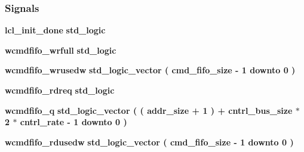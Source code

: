 \subsubsection*{Signals}
 \begin{DoxyCompactItemize}
\item 
{\bf lcl\+\_\+init\+\_\+done} {\bfseries \textcolor{comment}{std\+\_\+logic}\textcolor{vhdlchar}{ }} 
\item 
{\bf wcmdfifo\+\_\+wrfull} {\bfseries \textcolor{comment}{std\+\_\+logic}\textcolor{vhdlchar}{ }} 
\item 
{\bf wcmdfifo\+\_\+wrusedw} {\bfseries \textcolor{comment}{std\+\_\+logic\+\_\+vector}\textcolor{vhdlchar}{ }\textcolor{vhdlchar}{(}\textcolor{vhdlchar}{ }\textcolor{vhdlchar}{ }\textcolor{vhdlchar}{ }\textcolor{vhdlchar}{ }{\bfseries {\bf cmd\+\_\+fifo\+\_\+size}} \textcolor{vhdlchar}{-\/}\textcolor{vhdlchar}{ } \textcolor{vhdldigit}{1} \textcolor{vhdlchar}{ }\textcolor{keywordflow}{downto}\textcolor{vhdlchar}{ }\textcolor{vhdlchar}{ } \textcolor{vhdldigit}{0} \textcolor{vhdlchar}{ }\textcolor{vhdlchar}{)}\textcolor{vhdlchar}{ }} 
\item 
{\bf wcmdfifo\+\_\+rdreq} {\bfseries \textcolor{comment}{std\+\_\+logic}\textcolor{vhdlchar}{ }} 
\item 
{\bf wcmdfifo\+\_\+q} {\bfseries \textcolor{comment}{std\+\_\+logic\+\_\+vector}\textcolor{vhdlchar}{ }\textcolor{vhdlchar}{(}\textcolor{vhdlchar}{ }\textcolor{vhdlchar}{(}\textcolor{vhdlchar}{ }\textcolor{vhdlchar}{ }\textcolor{vhdlchar}{ }\textcolor{vhdlchar}{ }{\bfseries {\bf addr\+\_\+size}} \textcolor{vhdlchar}{+}\textcolor{vhdlchar}{ } \textcolor{vhdldigit}{1} \textcolor{vhdlchar}{ }\textcolor{vhdlchar}{)}\textcolor{vhdlchar}{ }\textcolor{vhdlchar}{+}\textcolor{vhdlchar}{ }\textcolor{vhdlchar}{ }\textcolor{vhdlchar}{ }{\bfseries {\bf cntrl\+\_\+bus\+\_\+size}} \textcolor{vhdlchar}{$\ast$}\textcolor{vhdlchar}{ } \textcolor{vhdldigit}{2} \textcolor{vhdlchar}{$\ast$}\textcolor{vhdlchar}{ }\textcolor{vhdlchar}{ }\textcolor{vhdlchar}{ }{\bfseries {\bf cntrl\+\_\+rate}} \textcolor{vhdlchar}{-\/}\textcolor{vhdlchar}{ } \textcolor{vhdldigit}{1} \textcolor{vhdlchar}{ }\textcolor{keywordflow}{downto}\textcolor{vhdlchar}{ }\textcolor{vhdlchar}{ } \textcolor{vhdldigit}{0} \textcolor{vhdlchar}{ }\textcolor{vhdlchar}{)}\textcolor{vhdlchar}{ }} 
\item 
{\bf wcmdfifo\+\_\+rdusedw} {\bfseries \textcolor{comment}{std\+\_\+logic\+\_\+vector}\textcolor{vhdlchar}{ }\textcolor{vhdlchar}{(}\textcolor{vhdlchar}{ }\textcolor{vhdlchar}{ }\textcolor{vhdlchar}{ }\textcolor{vhdlchar}{ }{\bfseries {\bf cmd\+\_\+fifo\+\_\+size}} \textcolor{vhdlchar}{-\/}\textcolor{vhdlchar}{ } \textcolor{vhdldigit}{1} \textcolor{vhdlchar}{ }\textcolor{keywordflow}{downto}\textcolor{vhdlchar}{ }\textcolor{vhdlchar}{ } \textcolor{vhdldigit}{0} \textcolor{vhdlchar}{ }\textcolor{vhdlchar}{)}\textcolor{vhdlchar}{ }} 

\end{DoxyCompactItemize}
